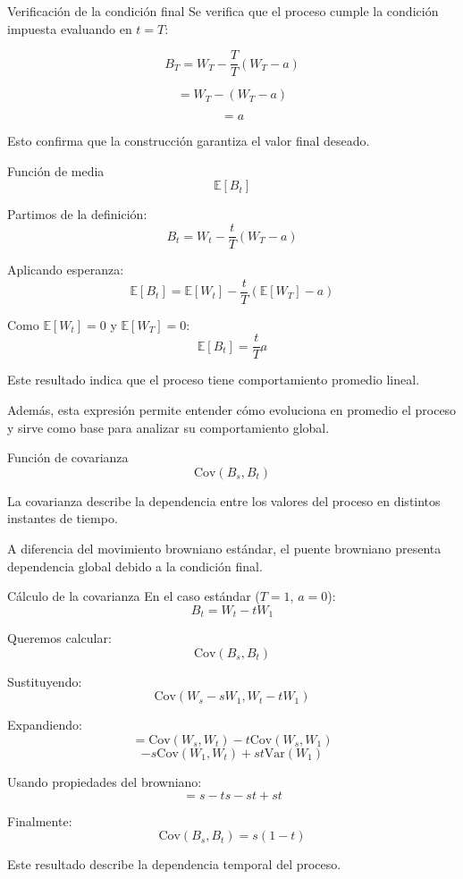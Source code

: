 \documentclass{beamer}
\begin{document}
\begin{frame}{Verificación de la condición final}
Se verifica que el proceso cumple la condición impuesta evaluando en $t=T$:

\[
B_T = W_T - \frac{T}{T}(W_T - a)
\]

\[
= W_T - (W_T - a)
\]

\[
= a
\]

Esto confirma que la construcción garantiza el valor final deseado.
\end{frame}

\begin{frame}{Función de media}
\[
\mathbb{E}[B_t]
\]

Partimos de la definición:
\[
B_t = W_t - \frac{t}{T}(W_T - a)
\]

Aplicando esperanza:
\[
\mathbb{E}[B_t] = \mathbb{E}[W_t] - \frac{t}{T}(\mathbb{E}[W_T] - a)
\]

Como $\mathbb{E}[W_t]=0$ y $\mathbb{E}[W_T]=0$:
\[
\mathbb{E}[B_t] = \frac{t}{T}a
\]

Este resultado indica que el proceso tiene comportamiento promedio lineal.

\vspace{0.3cm}
Además, esta expresión permite entender cómo evoluciona en promedio el proceso y sirve como base para analizar su comportamiento global.
\end{frame}

\begin{frame}{Función de covarianza}
\[
\mathrm{Cov}(B_s, B_t)
\]

La covarianza describe la dependencia entre los valores del proceso en distintos instantes de tiempo.

\vspace{0.3cm}
A diferencia del movimiento browniano estándar, el puente browniano presenta dependencia global debido a la condición final.
\end{frame}

\begin{frame}{Cálculo de la covarianza}
En el caso estándar ($T=1$, $a=0$):
\[
B_t = W_t - tW_1
\]

Queremos calcular:
\[
\mathrm{Cov}(B_s, B_t)
\]

Sustituyendo:
\[
\mathrm{Cov}(W_s - sW_1, W_t - tW_1)
\]

Expandiendo:
\[
= \mathrm{Cov}(W_s, W_t) - t\mathrm{Cov}(W_s, W_1)
\]
\[
- s\mathrm{Cov}(W_1, W_t) + st\mathrm{Var}(W_1)
\]

Usando propiedades del browniano:
\[
= s - ts - st + st
\]

Finalmente:
\[
\mathrm{Cov}(B_s, B_t) = s(1 - t)
\]

Este resultado describe la dependencia temporal del proceso.
\end{frame}
\end{document}
